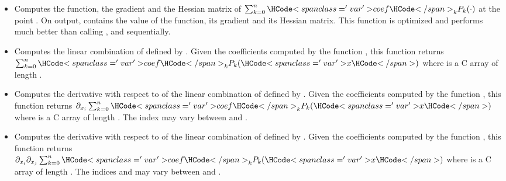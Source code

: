 \begin{itemize}
  \item {}
    \sshortdescribe Computes the function, the gradient and the Hessian matrix
    of $\sum_{k=0}^n \var{coef}_k  P_k(\cdot)$ at the point .
    On output,  contains the value of the function,  its
    gradient and  its Hessian matrix. This function is optimized and
    performs much better than calling ,
     and  sequentially.
    
  \item {}
    \sshortdescribe Computes the linear combination of  defined by
    . Given the coefficients computed by the function
    , this function returns $\sum_{k=0}^n
    \var{coef}_k  P_k(\var{x})$ where  is a C array of length
    .

  \item {}
    \sshortdescribe Computes the derivative with respect to  of the
    linear combination of  defined by . Given the
    coefficients computed by the function , this
    function returns $\partial_{x_i} \sum_{k=0}^n \var{coef}_k  P_k(\var{x})$
    where  is a C array of length . The index 
    may vary between  and .


  \item {}
    \sshortdescribe Computes the derivative with respect to  of the
    linear combination of  defined by . Given the
    coefficients computed by the function , this
    function returns $\partial_{x_i} \partial_{x_j} \sum_{k=0}^n \var{coef}_k  P_k(\var{x})$
    where  is a C array of length . The indices 
    and  may vary between  and .
\end{itemize}


